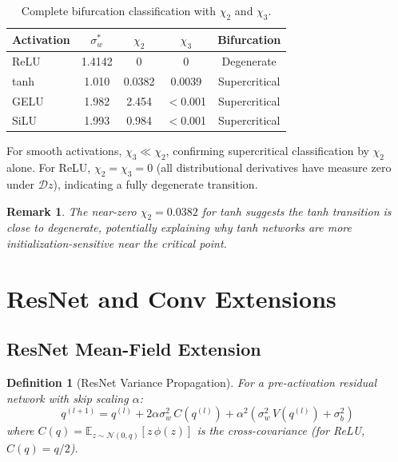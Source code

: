 \documentclass[10pt]{article}
\newcommand{\EE}{\mathbb{E}}
\newtheorem{definition}[theorem]{Definition}
\newtheorem{remark}[theorem]{Remark}
\begin{document}
\begin{table}[h]
\centering
\caption{Complete bifurcation classification with $\chi_2$ and $\chi_3$.}
\label{tab:chi3}
\small
\begin{tabular}{@{}lcccc@{}}
\toprule
\textbf{Activation} & $\sigma_w^*$ & $\chi_2$ & $\chi_3$ & \textbf{Bifurcation} \\
\midrule
ReLU  & 1.4142 & 0        & 0       & Degenerate \\
tanh  & 1.010  & 0.0382   & 0.0039  & Supercritical \\
GELU  & 1.982  & 2.454    & $<$0.001 & Supercritical \\
SiLU  & 1.993  & 0.984    & $<$0.001 & Supercritical \\
\bottomrule
\end{tabular}
\end{table}

For smooth activations, $\chi_3 \ll \chi_2$, confirming supercritical classification by $\chi_2$ alone.
For ReLU, $\chi_2 = \chi_3 = 0$ (all distributional derivatives have measure zero under $\mathcal{D}z$), indicating a fully degenerate transition.

\begin{remark}
The near-zero $\chi_2 = 0.0382$ for tanh suggests the tanh transition is close to degenerate, potentially explaining why tanh networks are more initialization-sensitive near the critical point.
\end{remark}

\section{ResNet and Conv Extensions}
\label{app:resnet}

\subsection{ResNet Mean-Field Extension}

\begin{definition}[ResNet Variance Propagation]
For a pre-activation residual network with skip scaling $\alpha$:
\begin{equation}
    q^{(l+1)} = q^{(l)} + 2\alpha\sigma_w^2\, C(q^{(l)}) + \alpha^2(\sigma_w^2\, V(q^{(l)}) + \sigma_b^2)
    \label{eq:resnet-variance}
\end{equation}
where $C(q) = \EE_{z\sim\mathcal{N}(0,q)}[z\,\phi(z)]$ is the cross-covariance (for ReLU, $C(q) = q/2$).
\end{definition}
\end{document}
